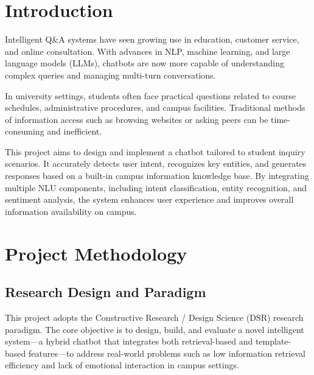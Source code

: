 \documentclass{xum_review}
\begin{document}
\tableofcontents
\newpage
\setcounter{page}{1}

\section{Introduction}

Intelligent Q\&A systems have seen growing use in education, customer service,
and online consultation. With advances in NLP, machine learning, and large
language models (LLMs), chatbots are now more capable of understanding complex
queries and managing multi-turn conversations.

In university settings, students often face practical questions related to
course schedules, administrative procedures, and campus facilities. Traditional
methods of information access such as browsing websites or asking peers can be
time-consuming and inefficient. 

This project aims to design and implement a chatbot tailored to student inquiry
scenarios. It accurately detects user intent, recognizes key entities, and
generates responses based on a built-in campus information knowledge base. By
integrating multiple NLU components, including intent classification, entity
recognition, and sentiment analysis, the system enhances user experience and
improves overall information availability on campus.

\section{Project Methodology}

	\subsection{Research Design and Paradigm}

	This project adopts the Constructive Research / Design Science (DSR)
	research paradigm. The core objective is to design, build, and evaluate a
	novel intelligent system—a hybrid chatbot that integrates both
	retrieval-based and template-based features—to address real-world problems
	such as low information retrieval efficiency and lack of emotional
	interaction in campus
	settings\citep{yang2019hybridretrievalgenerationneuralconversation}.
\end{document}
